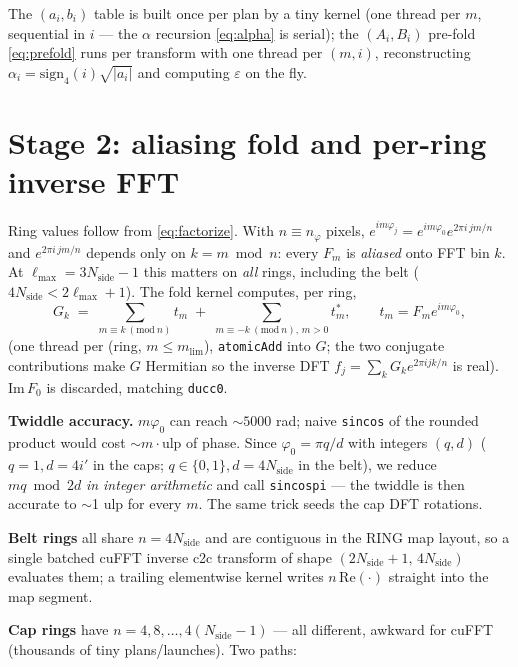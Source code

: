 \documentclass[11pt]{article}
\newcommand{\eps}{\varepsilon}
\begin{document}
The $(a_i,b_i)$ table is built once per plan by a tiny kernel (one thread
per $m$, sequential in $i$ --- the $\alpha$ recursion \eqref{eq:alpha} is
serial); the $(A_i,B_i)$ pre-fold \eqref{eq:prefold} runs per transform
with one thread per $(m,i)$, reconstructing
$\alpha_i = \mathrm{sign}_4(i)\sqrt{|a_i|}$ and computing $\eps$ on the fly.
\label{sec:tables}

\section{Stage 2: aliasing fold and per-ring inverse FFT}
\label{sec:fold}

Ring values follow from \eqref{eq:factorize}.  With $n \equiv n_\varphi$
pixels, $e^{im\varphi_j} = e^{im\varphi_0} e^{2\pi i\, jm/n}$ and
$e^{2\pi i\,jm/n}$ depends only on $k = m \bmod n$: every $F_m$ is
\emph{aliased} onto FFT bin $k$.  At $\ell_{\max} = 3N_\mathrm{side}-1$
this matters on \emph{all} rings, including the belt
($4N_\mathrm{side} < 2\ell_{\max}+1$).  The fold kernel computes, per ring,
\begin{equation}
G_k \;=\; \sum_{m \equiv k \ (\mathrm{mod}\ n)} t_m
     \;+\; \sum_{m \equiv -k \ (\mathrm{mod}\ n),\, m>0} t_m^{*},
\qquad t_m = F_m e^{im\varphi_0},
\end{equation}
(one thread per (ring, $m \le m_\mathrm{lim}$), \texttt{atomicAdd} into
$G$; the two conjugate contributions make $G$ Hermitian so the inverse DFT
$f_j = \sum_k G_k e^{2\pi i jk/n}$ is real).  $\mathrm{Im}\,F_0$ is
discarded, matching \texttt{ducc0}.

\textbf{Twiddle accuracy.}  $m\varphi_0$ can reach $\sim\!5000$ rad; naive
\texttt{sincos} of the rounded product would cost $\sim\!m\cdot$ulp of
phase.  Since $\varphi_0 = \pi q/d$ with integers $(q,d)$
($q{=}1, d{=}4i'$ in the caps; $q\in\{0,1\}, d{=}4N_\mathrm{side}$ in the
belt), we reduce $mq \bmod 2d$ \emph{in integer arithmetic} and call
\texttt{sincospi} --- the twiddle is then accurate to $\sim$1 ulp for every
$m$.  The same trick seeds the cap DFT rotations.

\textbf{Belt rings} all share $n = 4N_\mathrm{side}$ and are contiguous in
the RING map layout, so a single batched cuFFT inverse c2c transform of
shape $(2N_\mathrm{side}{+}1,\, 4N_\mathrm{side})$ evaluates them; a
trailing elementwise kernel writes $n\,\mathrm{Re}(\cdot)$ straight into
the map segment.

\textbf{Cap rings} have $n = 4, 8, \dots, 4(N_\mathrm{side}{-}1)$ --- all
different, awkward for cuFFT (thousands of tiny plans/launches).  Two
paths:
\end{document}
